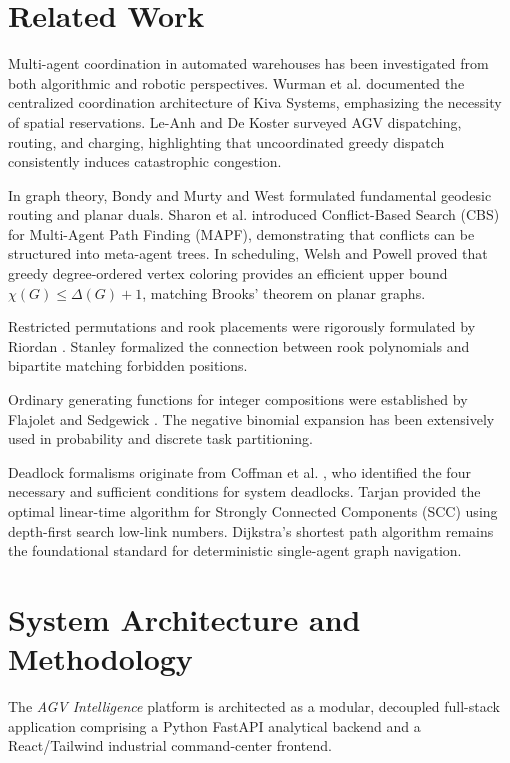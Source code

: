\documentclass[conference]{IEEEtran}
\begin{document}
\section{Related Work}
Multi-agent coordination in automated warehouses has been investigated from both algorithmic and robotic perspectives. Wurman et al. \cite{wurman2008coordinating} documented the centralized coordination architecture of Kiva Systems, emphasizing the necessity of spatial reservations. Le-Anh and De Koster \cite{leanh2006review} surveyed AGV dispatching, routing, and charging, highlighting that uncoordinated greedy dispatch consistently induces catastrophic congestion.

In graph theory, Bondy and Murty \cite{bondy1976graph} and West \cite{west2001graph} formulated fundamental geodesic routing and planar duals. Sharon et al. \cite{sharon2015conflict} introduced Conflict-Based Search (CBS) for Multi-Agent Path Finding (MAPF), demonstrating that conflicts can be structured into meta-agent trees. In scheduling, Welsh and Powell \cite{welsh1967upper} proved that greedy degree-ordered vertex coloring provides an efficient upper bound $\chi(G) \le \Delta(G) + 1$, matching Brooks' theorem \cite{brooks1941colouring} on planar graphs.

Restricted permutations and rook placements were rigorously formulated by Riordan \cite{riordan1958introduction}. Stanley \cite{stanley2011enumerative} formalized the connection between rook polynomials and bipartite matching forbidden positions.

Ordinary generating functions for integer compositions were established by Flajolet and Sedgewick \cite{flajolet2009analytic}. The negative binomial expansion has been extensively used in probability and discrete task partitioning.

Deadlock formalisms originate from Coffman et al. \cite{coffman1971system}, who identified the four necessary and sufficient conditions for system deadlocks. Tarjan \cite{tarjan1972depth} provided the optimal linear-time algorithm for Strongly Connected Components (SCC) using depth-first search low-link numbers. Dijkstra's shortest path algorithm \cite{dijkstra1959note} remains the foundational standard for deterministic single-agent graph navigation.

\section{System Architecture and Methodology}
The \textit{AGV Intelligence} platform is architected as a modular, decoupled full-stack application comprising a Python FastAPI analytical backend and a React/Tailwind industrial command-center frontend.
\end{document}
